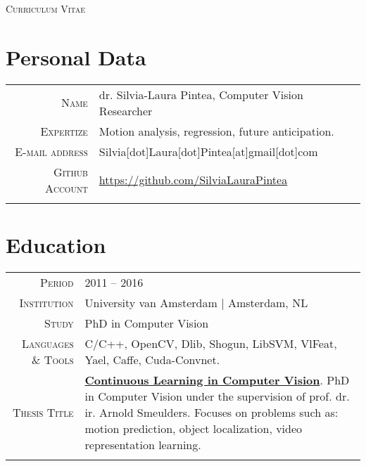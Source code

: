 \documentclass[a4paper, oneside, final]{scrartcl}
\newcommand{\gray}{\rowcolor[gray]{.90}}
\begin{document}
	\fontsize{9px}{11px}\selectfont
	\pagestyle{empty} %
	\begin{center} 
	\textsc{\Large\textsc{Curriculum Vitae}}
		\section{Personal Data}
		\begin{tabular}{r@{\hskip 0.3in}p{11.3cm}}
			\textsc{Name}            & dr. Silvia-Laura Pintea, Computer Vision Researcher\\
			\textsc{Expertize}	     & Motion analysis, regression, future anticipation.\\
			\textsc{E-mail address}  & Silvia[dot]Laura[dot]Pintea[at]gmail[dot]com\\
			\textsc{Github Account}  & \href{https://github.com/SilviaLauraPintea}{https://github.com/SilviaLauraPintea}\\	
			\multicolumn{2}{c}{}\\ 
		\end{tabular}
		\section{Education}
		\begin{tabular}{r@{\hskip 0.3in}p{11.3cm}}
			\gray \textsc{Period}        & \textsc{2011 -- 2016}\\
			\textsc{Institution}         & University van Amsterdam $\mid$ Amsterdam, NL\\
			\textsc{Study}               & PhD in Computer Vision\\
			\textsc{Languages \& Tools}  & C\slash C++, OpenCV, Dlib, Shogun, LibSVM, VlFeat, Yael, Caffe, Cuda-Convnet.\\
			\textsc{Thesis Title}        & \textbf{\href{http://dare.uva.nl/search?identifier=90ad88f5-c16e-4450-86f2-23faa250fcab}{Continuous Learning in Computer Vision}}. 
				PhD in Computer Vision under the supervision of prof. dr. ir. Arnold Smeulders. 
				Focuses on problems such as: motion prediction, object localization, video representation learning.\\
			\multicolumn{2}{c}{}\\


\end{tabular}
\end{center}
\end{document}
